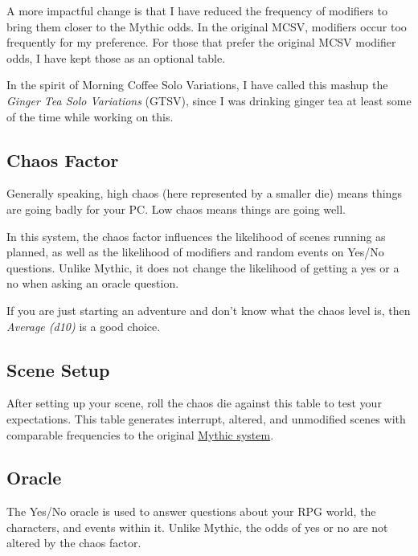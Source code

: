 A more impactful change is that I have reduced the frequency of modifiers to
bring them closer to the Mythic odds. In the original MCSV, modifiers occur too
frequently for my preference. For those that prefer the original MCSV modifier odds,
I have kept those as an optional table.

In the spirit of Morning Coffee Solo Variations, I have called this mashup the
\emph{Ginger Tea Solo Variations} (GTSV), since I was drinking ginger tea at
least some of the time while working on this.

\begin{multicols}{2}
\clearfloat{}

\subsection{Chaos Factor}
Generally speaking, high chaos (here represented by a smaller die) means things
are going badly for your PC\@. Low chaos means things are going well.

In this system, the chaos factor influences the likelihood of scenes running as
planned, as well as the likelihood of modifiers and random events on Yes/No
questions. Unlike Mythic, it does not change the likelihood of getting a yes or
a no when asking an oracle question.

If you are just starting an adventure and don't know what the chaos level is,
then \emph{Average (d10)} is a good choice.



\subsection{Scene Setup}
After setting up your scene, roll the chaos die against this table to test your
expectations. This table generates interrupt, altered, and unmodified scenes
with comparable frequencies to the original
\href{https://www.wordmillgames.com/mythic-gme.html}{Mythic system}.


\subsection{Oracle}
The Yes/No oracle is used to answer questions about your RPG world, the
characters, and events within it. Unlike Mythic, the odds of yes or no are not
altered by the chaos factor.


\end{multicols}
